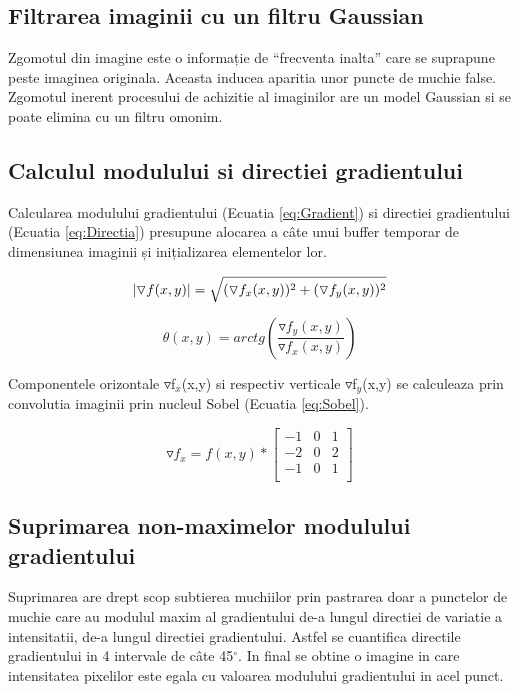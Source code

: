 \documentclass[conference]{IEEEtran}
\begin{document}
\subsection{Filtrarea imaginii cu un filtru Gaussian}
Zgomotul din imagine este o informație de “frecventa inalta” care se suprapune peste imaginea originala. Aceasta inducea aparitia unor puncte de muchie false. Zgomotul inerent procesului de achizitie al imaginilor are un model Gaussian si se poate elimina cu un filtru omonim.

\subsection{Calculul modulului si directiei gradientului}
Calcularea modulului gradientului (Ecuatia \ref{eq:Gradient}) si directiei gradientului (Ecuatia \ref{eq:Directia}) presupune alocarea a câte unui buffer temporar de dimensiunea imaginii și inițializarea elementelor lor.

\begin{equation} \label{eq:Gradient}
\abs{\triangledown f(x,y)} = \sqrt{(\triangledown f_{x}(x,y))^2 + (\triangledown f_{y}(x,y))^2}
\end{equation}

\begin{equation} \label{eq:Directia}
\theta(x,y) = arctg(\frac{\triangledown f_{y}(x,y)}{\triangledown f_{x}(x,y)})
\end{equation}

Componentele orizontale $\triangledown$f$_{x}$(x,y) si respectiv verticale $\triangledown$f$_{y}$(x,y) se calculeaza prin convolutia imaginii prin nucleul Sobel (Ecuatia \ref{eq:Sobel}).

\begin{equation} \label{eq:Sobel}
	\triangledown f_{x} = f(x,y)*	
	\begin{bmatrix}
		-1 & 0 & 1\\
		-2 & 0 & 2\\
		-1 & 0 & 1\\
	\end{bmatrix}
\end{equation}

\subsection{Suprimarea non-maximelor modulului gradientului}
Suprimarea are drept scop subtierea muchiilor prin pastrarea doar a punctelor de muchie care au modulul maxim al gradientului de-a lungul directiei de variatie a intensitatii, de-a lungul directiei gradientului. Astfel se cuantifica directile gradientului in 4 intervale de câte 45$^\circ$. In final se obtine o imagine in care intensitatea pixelilor este egala cu valoarea modulului gradientului in acel punct.
\end{document}
